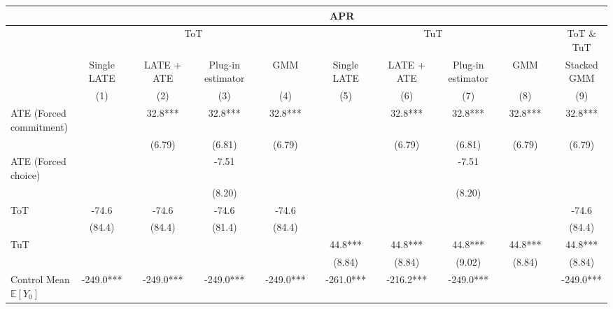 \begin{tabular}{lccccccccccccccccc}
\toprule
      & \multicolumn{17}{c}{APR} \\
\midrule
      & \multicolumn{7}{c}{ToT}                               &       & \multicolumn{7}{c}{TuT}                               &       & ToT \& TuT \\
\cmidrule{2-8}\cmidrule{10-16}\cmidrule{18-18}      & Single LATE &       & LATE + ATE &       & Plug-in estimator &       & GMM   &       & Single LATE &       & LATE + ATE &       & Plug-in estimator &       & GMM   &       & Stacked GMM \\
\cmidrule{2-2}\cmidrule{4-4}\cmidrule{6-6}\cmidrule{8-8}\cmidrule{10-10}\cmidrule{12-12}\cmidrule{14-14}\cmidrule{16-16}\cmidrule{18-18}      & (1)   &       & (2)   &       & (3)   &       & (4)   &       & (5)   &       & (6)   &       & (7)   &       & (8)   &       & (9) \\
\midrule
\midrule
ATE (Forced commitment) &       &       & 32.8*** &       & 32.8*** &       & 32.8*** &       &       &       & 32.8*** &       & 32.8*** &       & 32.8*** &       & 32.8*** \\
      &       &       & (6.79) &       & (6.81) &       & (6.79) &       &       &       & (6.79) &       & (6.81) &       & (6.79) &       & (6.79) \\
ATE (Forced choice) &       &       &       &       & -7.51 &       &       &       &       &       &       &       & -7.51 &       &       &       &  \\
      &       &       &       &       & (8.20) &       &       &       &       &       &       &       & (8.20) &       &       &       &  \\
ToT   & -74.6 &       & -74.6 &       & -74.6 &       & -74.6 &       &       &       &       &       &       &       &       &       & -74.6 \\
      & (84.4) &       & (84.4) &       & (81.4) &       & (84.4) &       &       &       &       &       &       &       &       &       & (84.4) \\
TuT   &       &       &       &       &       &       &       &       & 44.8*** &       & 44.8*** &       & 44.8*** &       & 44.8*** &       & 44.8*** \\
      &       &       &       &       &       &       &       &       & (8.84) &       & (8.84) &       & (9.02) &       & (8.84) &       & (8.84) \\
Control Mean $\mathbb{E}[Y_0]$ & -249.0*** &       & -249.0*** &       & -249.0*** &       & -249.0*** &       & -261.0*** &       & -216.2*** &       & -249.0*** &       &       &       & -249.0*** \\

\end{tabular}
